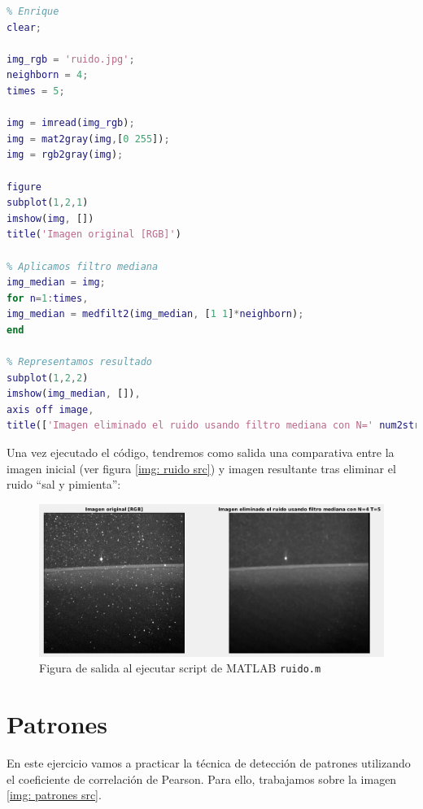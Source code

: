 \documentclass[12pt]{article}
\begin{document}
	\begin{lstlisting}[language=Matlab, caption={Implementación filtro mediana para reducir ruido en \texttt{MATLAB}}]
% 6 - Ruido Sal y Pimienta
% Enrique
clear;

img_rgb = 'ruido.jpg';
neighborn = 4;
times = 5;

img = imread(img_rgb);
img = mat2gray(img,[0 255]);
img = rgb2gray(img);

figure
subplot(1,2,1)
imshow(img, [])
title('Imagen original [RGB]')

% Aplicamos filtro mediana
img_median = img;
for n=1:times,
img_median = medfilt2(img_median, [1 1]*neighborn);
end

% Representamos resultado
subplot(1,2,2)
imshow(img_median, []),
axis off image,
title(['Imagen eliminado el ruido usando filtro mediana con N=' num2str(neighborn) ' T=' num2str(times) ])
	\end{lstlisting}

	\vspace{10px}

	\noindent Una vez ejecutado el código, tendremos como salida una comparativa entre la imagen inicial (ver figura \ref{img: ruido src}) y imagen resultante tras eliminar el ruido ``sal y pimienta'':
	
	\begin{figure}[h]
		\begin{center}
			\includegraphics[width=1\textwidth]{img/ruido_output.png}
			\caption{Figura de salida al ejecutar script de MATLAB \texttt{ruido.m}}
			\label{img: ruido output}
		\end{center}
	\end{figure}
	
	\pagebreak
	
	\section{Patrones}
	\noindent En este ejercicio vamos a practicar la técnica de detección de patrones utilizando el coeficiente de correlación de Pearson. Para ello, trabajamos sobre la imagen \ref{img: patrones src}.
	
\end{document}
